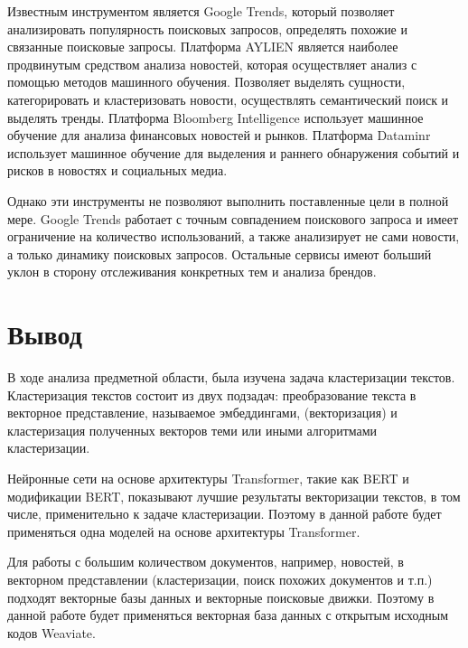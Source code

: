 Известным инструментом является Google Trends, который позволяет анализировать
популярность поисковых запросов, определять похожие и связанные поисковые запросы.
Платформа AYLIEN является наиболее продвинутым средством анализа новостей, которая
осуществляет анализ с помощью методов машинного обучения. Позволяет выделять
сущности, категорировать и кластеризовать новости, осуществлять семантический поиск и
выделять тренды.
Платформа Bloomberg Intelligence использует машинное обучение для анализа финансовых
новостей и рынков.
Платформа Dataminr использует машинное обучение для выделения и раннего обнаружения
событий и рисков в новостях и социальных медиа.

Однако эти инструменты не позволяют выполнить поставленные цели в полной мере. Google Trends работает с точным совпадением поискового запроса и имеет ограничение на количество использований, а также анализирует не сами новости, а только динамику поисковых запросов. Остальные сервисы имеют больший уклон в сторону отслеживания конкретных тем и анализа брендов.

\section{Вывод}
В ходе анализа предметной области, была изучена задача кластеризации текстов. Кластеризация текстов состоит из двух подзадач: преобразование текста в векторное представление, называемое эмбеддингами, (векторизация) и кластеризация полученных векторов теми или иными алгоритмами кластеризации.

Нейронные сети на основе архитектуры Transformer, такие как BERT и модификации BERT, показывают лучшие результаты векторизации текстов, в том числе, применительно к задаче кластеризации. Поэтому в данной работе будет применяться одна моделей на основе архитектуры Transformer.

Для работы с большим количеством документов, например, новостей, в векторном представлении (кластеризации, поиск похожих документов и т.п.) подходят векторные базы данных и векторные поисковые движки. Поэтому в данной работе будет применяться векторная база данных с открытым исходным кодов Weaviate.
